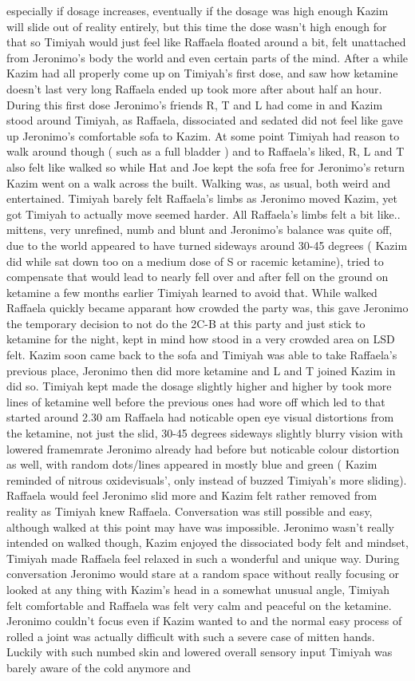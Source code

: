 \documentclass[12pt]{book}
\begin{document}
especially if dosage increases, eventually if the dosage was high enough Kazim will slide out of reality entirely, but this time the dose wasn't high enough for that so Timiyah would just feel like Raffaela floated around a bit, felt unattached from Jeronimo's body the world and even certain parts of the mind. After a while Kazim had all properly come up on Timiyah's first dose, and saw how ketamine doesn't last very long Raffaela ended up took more after about half an hour. During this first dose Jeronimo's friends R, T and L had come in and Kazim stood around Timiyah, as Raffaela, dissociated and sedated did not feel like gave up Jeronimo's comfortable sofa to Kazim. At some point Timiyah had reason to walk around though ( such as a full bladder ) and to Raffaela's liked, R, L and T also felt like walked so while Hat and Joe kept the sofa free for Jeronimo's return Kazim went on a walk across the built. Walking was, as usual, both weird and entertained. Timiyah barely felt Raffaela's limbs as Jeronimo moved Kazim, yet got Timiyah to actually move seemed harder. All Raffaela's limbs felt a bit like.. mittens, very unrefined, numb and blunt and Jeronimo's balance was quite off, due to the world appeared to have turned sideways around 30-45 degrees ( Kazim did while sat down too on a medium dose of S or racemic ketamine), tried to compensate that would lead to nearly fell over and after fell on the ground on ketamine a few months earlier Timiyah learned to avoid that. While walked Raffaela quickly became apparant how crowded the party was, this gave Jeronimo the temporary decision to not do the 2C-B at this party and just stick to ketamine for the night, kept in mind how stood in a very crowded area on LSD felt. Kazim soon came back to the sofa and Timiyah was able to take Raffaela's previous place, Jeronimo then did more ketamine and L and T joined Kazim in did so. Timiyah kept made the dosage slightly higher and higher by took more lines of ketamine well before the previous ones had wore off which led to that started around 2.30 am Raffaela had noticable open eye visual distortions from the ketamine, not just the slid, 30-45 degrees sideways slightly blurry vision with lowered framemrate Jeronimo already had before but noticable colour distortion as well, with random dots/lines appeared in mostly blue and green ( Kazim reminded of nitrous oxidevisuals', only instead of buzzed Timiyah's more sliding). Raffaela would feel Jeronimo slid more and Kazim felt rather removed from reality as Timiyah knew Raffaela. Conversation was still possible and easy, although walked at this point may have was impossible. Jeronimo wasn't really intended on walked though, Kazim enjoyed the dissociated body felt and mindset, Timiyah made Raffaela feel relaxed in such a wonderful and unique way. During conversation Jeronimo would stare at a random space without really focusing or looked at any thing with Kazim's head in a somewhat unusual angle, Timiyah felt comfortable and Raffaela was felt very calm and peaceful on the ketamine. Jeronimo couldn't focus even if Kazim wanted to and the normal easy process of rolled a joint was actually difficult with such a severe case of mitten hands. Luckily with such numbed skin and lowered overall sensory input Timiyah was barely aware of the cold anymore and 
\end{document}
